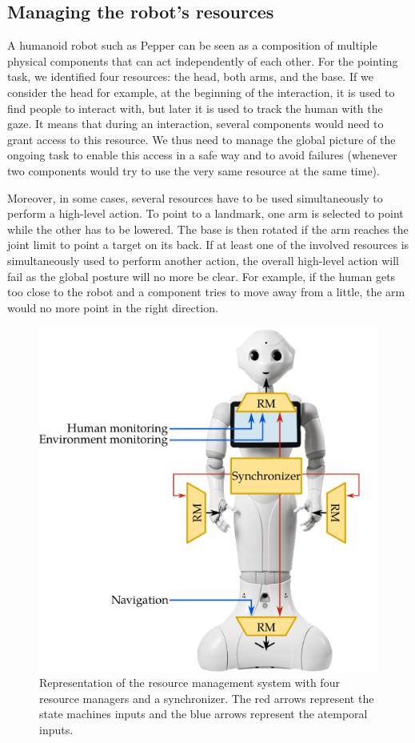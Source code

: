 \subsection{Managing the robot's resources}

A humanoid robot such as Pepper can be seen as a composition of multiple physical components that can act independently of each other. For the pointing task, we identified four resources: the head, both arms, and the base. If we consider the head for example, at the beginning of the interaction, it is used to find people to interact with, but later it is used to track the human with the gaze. It means that during an interaction, several components would need to grant access to this resource. We thus need to manage the global picture of the ongoing task to enable this access in a safe way and to avoid failures (whenever two components would try to use the very same resource at the same time).

Moreover, in some cases, several resources have to be used simultaneously to perform a high-level action. To point to a landmark, one arm is selected to point while the other has to be lowered. The base is then rotated if the arm reaches the joint limit to point a target on its back. If at least one of the involved resources is simultaneously used to perform another action, the overall high-level action will fail as the global posture will no more be clear. For example, if the human gets too close to the robot and a component tries to move away from a little, the arm would no more point in the right direction.

\begin{figure}[!b]
\centering
\includegraphics[scale=0.26]{figures/chapter8/rm.png}
\caption{\label{fig:chap8_rm} Representation of the resource management system with four resource managers and a synchronizer. The red arrows represent the state machines inputs and the blue arrows represent the atemporal inputs.}
\end{figure}

